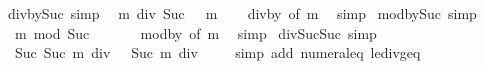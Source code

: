 \begin{isabellebody}
\endisatagproof
{\isafoldproof}%
%
\isadelimproof
\isanewline
%
\endisadelimproof
\isanewline
{}\isamarkupfalse%
\ div{\isacharunderscore}{\kern0pt}by{\isacharunderscore}{\kern0pt}Suc{\isacharunderscore}{\kern0pt}{}\ {\isacharbrackleft}{\kern0pt}simp{\isacharbrackright}{\kern0pt}{\isacharcolon}{\kern0pt}\isanewline
\ \ {\isachardoublequoteopen}m\ div\ Suc\ {}\ {\isacharequal}{\kern0pt}\ m{\isachardoublequoteclose}\isanewline
%
\isadelimproof
\ \ %
\endisadelimproof
%
\isatagproof
{}\isamarkupfalse%
\ div{\isacharunderscore}{\kern0pt}by{\isacharunderscore}{\kern0pt}{}\ {\isacharbrackleft}{\kern0pt}of\ m{\isacharbrackright}{\kern0pt}\ \isamarkupfalse%
\ simp%
\endisatagproof
{\isafoldproof}%
%
\isadelimproof
\isanewline
%
\endisadelimproof
\isanewline
{}\isamarkupfalse%
\ mod{\isacharunderscore}{\kern0pt}by{\isacharunderscore}{\kern0pt}Suc{\isacharunderscore}{\kern0pt}{}\ {\isacharbrackleft}{\kern0pt}simp{\isacharbrackright}{\kern0pt}{\isacharcolon}{\kern0pt}\isanewline
\ \ {\isachardoublequoteopen}m\ mod\ Suc\ {}\ {\isacharequal}{\kern0pt}\ {}{\isachardoublequoteclose}\isanewline
%
\isadelimproof
\ \ %
\endisadelimproof
%
\isatagproof
{}\isamarkupfalse%
\ mod{\isacharunderscore}{\kern0pt}by{\isacharunderscore}{\kern0pt}{}\ {\isacharbrackleft}{\kern0pt}of\ m{\isacharbrackright}{\kern0pt}\ \isamarkupfalse%
\ simp%
\endisatagproof
{\isafoldproof}%
%
\isadelimproof
\isanewline
%
\endisadelimproof
\isanewline
{}\isamarkupfalse%
\ div{}{\isacharunderscore}{\kern0pt}Suc{\isacharunderscore}{\kern0pt}Suc\ {\isacharbrackleft}{\kern0pt}simp{\isacharbrackright}{\kern0pt}{\isacharcolon}{\kern0pt}\isanewline
\ \ {\isachardoublequoteopen}Suc\ {\isacharparenleft}{\kern0pt}Suc\ m{\isacharparenright}{\kern0pt}\ div\ {}\ {\isacharequal}{\kern0pt}\ Suc\ {\isacharparenleft}{\kern0pt}m\ div\ {}{\isacharparenright}{\kern0pt}{\isachardoublequoteclose}\isanewline
%
\isadelimproof
\ \ %
\endisadelimproof
%
\isatagproof
{}\isamarkupfalse%
\ {\isacharparenleft}{\kern0pt}simp\ add{\isacharcolon}{\kern0pt}\ numeral{\isacharunderscore}{\kern0pt}{}{\isacharunderscore}{\kern0pt}eq{\isacharunderscore}{\kern0pt}{}\ le{\isacharunderscore}{\kern0pt}div{\isacharunderscore}{\kern0pt}geq{\isacharparenright}{\kern0pt}%
\endisatagproof
{\isafoldproof}%
%
\isadelimproof
\isanewline
%
\endisadelimproof
\isanewline
{}\isamarkupfalse%

\end{isabellebody}
